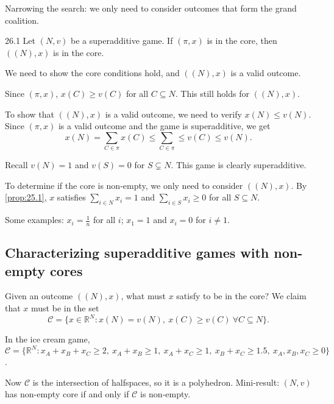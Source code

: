 \documentclass[12pt,letterpaper]{report}
\begin{document}
Narrowing the search: we only need to consider outcomes that form the grand coalition.

\begin{prop}{}{26.1}
  Let $(N, v)$ be a superadditive game.
  If $(\pi, x)$ is in the core, then $((N), x)$ is in the core.
\end{prop}

\begin{thmproof}
  We need to show the core conditions hold, and $((N), x)$ is a valid outcome.

  Since $(\pi, x)$, $x(C) \geq v(C)$ for all $C \subseteq N$.
  This still holds for $((N), x)$.

  To show that $((N), x)$ is a valid outcome, we need to verify $x(N) \leq v(N)$.
  Since $(\pi, x)$ is a valid outcome and the game is superadditive, we get
  \[
    x(N) = \sum_{C \in \pi} x(C) \leq \sum_{C \in \pi} \leq v(C) \leq v(N).
  \]
\end{thmproof}

\begin{ex}
  Recall $v(N) = 1$ and $v(S) = 0$ for $S \subsetneq N$.
  This game is clearly superadditive.

  To determine if the core is non-empty, we only need to consider $((N), x)$.
  By \cref{prop:25.1}, $x$ satisfies $\sum\limits_{i \in N} x_i = 1$ and
  $\sum\limits_{i \in S} x_i \geq 0$ for all $S \subseteq N$.

  Some examples: $x_i = \frac{1}{n}$ for all $i$; $x_1 = 1$ and $x_i = 0$ for $i \neq 1$.
\end{ex}

\subsection{Characterizing superadditive games with non-empty cores}

Given an outcome $((N), x)$, what must $x$ satisfy to be in the core?
We claim that $x$ must be in the set
\[
  \mathcal{C} = \{ x \in \mathbb{R}^N : x(N) = v(N), \ x(C) \geq v(C) \ \forall C \subseteq N \}.
\]

\begin{ex}
  In the ice cream game, $\mathcal{C} = \{ \mathbb{R}^N : x_A + x_B + x_C \geq 2, \
  x_A + x_B \geq 1, \ x_A + x_C \geq 1, \ x_B + x_C \geq 1.5, \ x_A, x_B, x_C \geq 0 \}$.
\end{ex}

Now $\mathcal{C}$ is the intersection of halfspaces, so it is a polyhedron.
Mini-result: $(N, v)$ has non-empty core if and only if $\mathcal{C}$ is non-empty.
\end{document}
